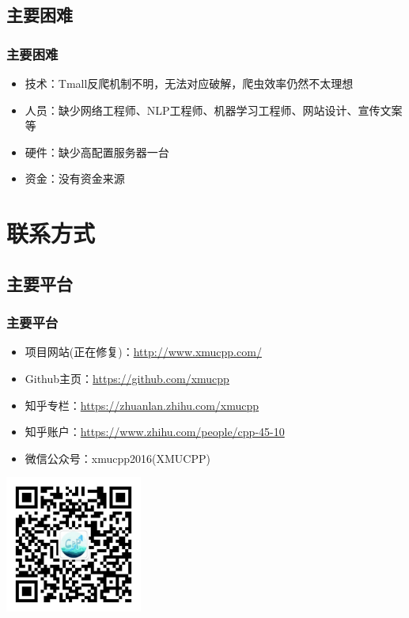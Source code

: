 \documentclass{beamer}
\begin{document}
\subsection{主要困难}
\begin{frame}
\frametitle{主要困难}
\begin{itemize}
  \item 技术：Tmall反爬机制不明，无法对应破解，爬虫效率仍然不太理想
  \item 人员：缺少网络工程师、NLP工程师、机器学习工程师、网站设计、宣传文案等
  \item 硬件：缺少高配置服务器一台
  \item 资金：没有资金来源
\end{itemize}
\end{frame}

\section{联系方式}
\subsection{主要平台}
\begin{frame}[allowframebreaks]
\frametitle{主要平台}
\begin{itemize}
  \item 项目网站(正在修复)：\url{http://www.xmucpp.com/}
  \item Github主页：\url{https://github.com/xmucpp}
  \item 知乎专栏：\url{https://zhuanlan.zhihu.com/xmucpp}
  \item 知乎账户：\url{https://www.zhihu.com/people/cpp-45-10}
  \framebreak
  \item 微信公众号：xmucpp2016(XMUCPP)
\end{itemize}
\begin{center}
\includegraphics[width=4.5cm,height=4.5cm]{wechat.jpg}
\end{center}
\end{frame}
\end{document}
